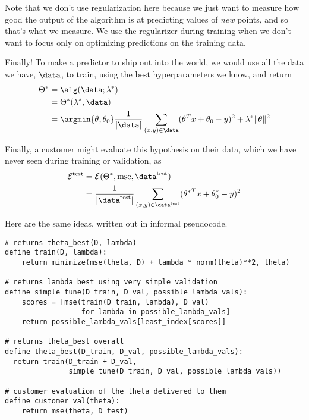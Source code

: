 Note that we don't use regularization here because we just want to measure how good the
output of the algorithm is at predicting values of {\em new} points,
and so that's what we measure.   We use the regularizer during
training when we don't want to focus only on optimizing predictions on
the training data.

Finally!  To make a predictor to ship out into the world, we would use
all the data we have, $\data$, to train, using the best
hyperparameters we know, and return 
\begin{align*}
  \Theta^* & = \alg(\data; \lambda^*) \\
           & = \Theta^*(\lambda^*, \data) \\
      & = \argmin{\theta, \theta_0}
    \frac{1}{|\data|} \sum_{(x, y) \in \data} (\theta^Tx +
        \theta_0 - y)^2 + \lambda^*\|\theta\|^2\\
\end{align*} 

Finally, a customer might evaluate this hypothesis on their data,
        which we have never seen during training or validation, as
\begin{align*}
\mathcal{E}^\text{test} & = \mathcal{E}(\Theta^*, \text{mse},
                          \data^\text{test})        \\
  & = \frac{1}{|\data^\text{test}|} \sum_{(x, y) \in \data^\text{test}} ({\theta^*}^Tx +
    \theta_0^* - y)^2\\
\end{align*}

Here are the same ideas, written out in informal pseudocode.        
\begin{verbatim}
# returns theta_best(D, lambda)
define train(D, lambda):
    return minimize(mse(theta, D) + lambda * norm(theta)**2, theta)

# returns lambda_best using very simple validation
define simple_tune(D_train, D_val, possible_lambda_vals):
    scores = [mse(train(D_train, lambda), D_val)
                  for lambda in possible_lambda_vals]
    return possible_lambda_vals[least_index[scores]]

# returns theta_best overall
define theta_best(D_train, D_val, possible_lambda_vals):
  return train(D_train + D_val, 
               simple_tune(D_train, D_val, possible_lambda_vals))

# customer evaluation of the theta delivered to them
define customer_val(theta):
    return mse(theta, D_test)

\end{verbatim}

